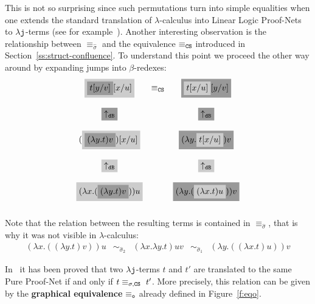 \documentclass{LMCS}
\renewcommand{\>}{\rightarrow}
\def\lam{\lambda}
\def\sig{\sigma}
\newcommand{\B}{{\tt dB}}
\newcommand{\dis}{{\tt j}}
\newcommand{\ldis}{\lam{\dis}}
\newcommand{\lj}{\lam{\dis}}
\newcommand{\fv}[1]{{\tt fv}(#1)}
\newcommand{\CS}{{\tt CS}}
\newcommand{\deft}[1]{{\bf #1}}
\newcommand{\ignore}[1]{}
\newcommand{\eqw}[1]{\equiv_{#1}}
\newcommand{\eqo}{\equiv_\osym}
\newcommand{\preeq}{\sim}
\newcommand{\preeqw}[1]{\sim_{#1}}
\def\rsig{\hat{\sigma}}
\newcommand{\osym}{{\tt o}}
\newcommand{\preeqsigu}{\preeq_{\sigma_1}}
\newcommand{\preeqsigt}{\preeq_{\sigma_2}}
\newcommand{\grisar}[1]{\colorbox{LightGray}{\ensuremath{#1}}}
\newcommand{\grisarOscuro}[1]{\colorbox{DarkGray}{\ensuremath{#1}}}
\begin{document}
This is not so surprising since such permutations turn into simple
equalities when one extends the standard translation of $\lam$-calculus
into Linear Logic Proof-Nets to $\ldis$-terms (see for
example~\cite{KL07}). Another interesting observation is the relationship between $\eqw{\rsig}$ and
the equivalence $\equiv_{\CS}$ introduced in
Section~\ref{ss:struct-confluence}. To understand this point we
proceed the other way around by expanding jumps into $\beta$-redexes:
\[ \begin{array}{cccccccc}
\grisar{\grisarOscuro{t[y/v]}[x/u]} & \equiv_{\CS} & \grisarOscuro{\grisar{t[x/u]}[y/v]}\\ \\
 	\grisarOscuro{\uparrow_\B} & &  	\grisarOscuro{\uparrow_\B}\\ \\
	(\grisar{\grisarOscuro{(\lam y. t) v}) [x/u]} & & 
        \grisarOscuro{(\lam y.\grisar{t [x/u]}) v}\\ \\
 	\grisar{\uparrow_\B} & &  	\grisar{\uparrow_\B}\\ \\
	\grisar{(\lam x. (\grisarOscuro{(\lam y. t) v})) u} & & \grisarOscuro{(\lam y. (\grisar{(\lam x. t) u})) v}\\ \\
\end{array}\] 
Note that 
the relation between the
resulting terms is
contained in $\eqw{\rsig}$, that is why it was not visible
in $\lam$-calculus:
\[ \begin{array}{cccccccc}
(\lam x. ((\lam y. t) v)) u & \preeqw{\rsig_2} & (\lam x.\lam y. t) u v& \preeqw{\rsig_1} & (\lam y. ((\lam x. t) u)) v
\end{array}\] 

In~\cite{AccattoliTh} it has been proved that two $\lj$-terms $t$
  and $t'$ are translated to the same Pure Proof-Net if and only if
  $t \equiv_{\sig, \CS}\  t'$. More precisely, this relation
can be given by the \deft{graphical equivalence}
$\eqo$ already defined  in Figure~\ref{f:eqo}. 
\ignore{
\begin{figure}[ht]
\[ \begin{array}{lll@{\hspace{.5cm}}l}
   t[x/s][y/v] & \sim_{\CS} & t[y/v][x/s] & \mbox{ if } x\notin\fv{v}\ \&\ y\notin\fv{s}  \\
   \lam y. (t [x/s]) & \preeqsigu & (\lam y. t) [x/s]  & \mbox{ if } y\notin \fv{s} \\
   t[x/s] v & \preeqsigt & (t v)[x/s]& \mbox{ if } x\notin\fv{v} \\
   \end{array} \] 
\caption{The $\eqo$-equivalence relation}
\label{f:eqo}
\end{figure}
}
\end{document}
